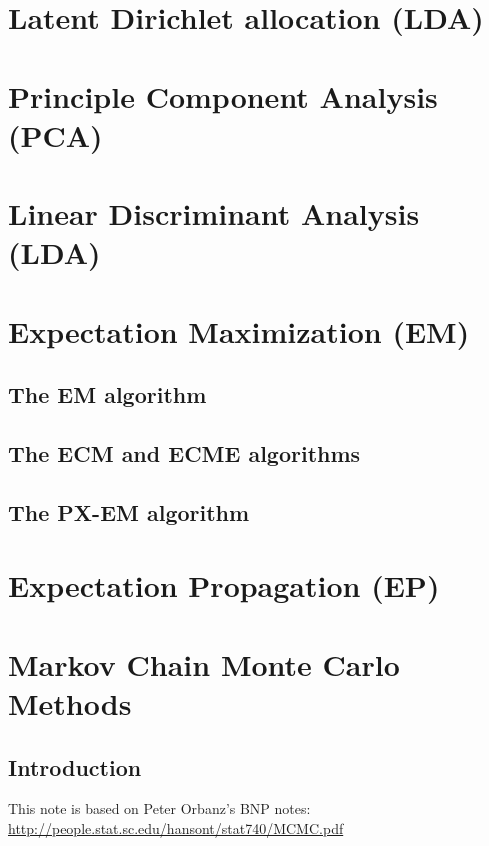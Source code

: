 \documentclass{book}
\begin{document}



\chapter{Latent Dirichlet allocation (LDA)}
\chapter{Principle Component Analysis (PCA)}
\chapter{Linear Discriminant Analysis (LDA)}

\chapter{Expectation Maximization (EM)}
\section{The EM algorithm}
\section{The ECM and ECME algorithms}
\section{The PX-EM algorithm}

\chapter{Expectation Propagation (EP)}


\chapter{Markov Chain Monte Carlo Methods}
\section{Introduction}
This note is based on Peter Orbanz's BNP notes:
\vspace*{5mm}
\\
\url{http://people.stat.sc.edu/hansont/stat740/MCMC.pdf}
\end{document}
